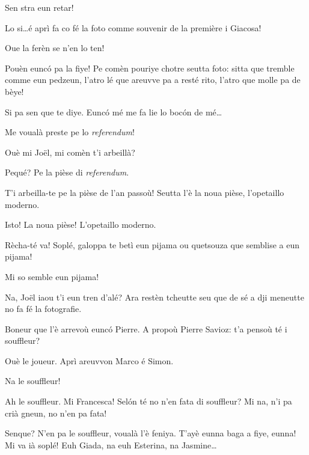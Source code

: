 \begin{drama}
\Francescaspeaks Sen stra eun retar!

\Joellespeaks Lo si\ldots é aprì fa co fé la foto comme souvenir de la première i Giacosa!

\Francescaspeaks Oue la ferèn se n'en lo ten!

 \Joellespeaks Pouèn euncó pa la fiye! Pe comèn pouriye chotre seutta foto: sitta  que tremble comme eun pedzeun, l’atro lé  que areuvve pa a resté rito, l'atro que molle pa de bèye!
 
 \Francescaspeaks Si pa sen que te diye. Euncó mé me fa lie lo boc\'on de mé\ldots
 

\Joelspeaks{} Me voualà preste pe lo \textit{referendum}!

\Joellespeaks Ouè mi Jo\"{e}l, mi comèn t'i arbeillà?

\Joelspeaks Pequé? Pe la pièse di \textit{referendum}.

\Joellespeaks T'i arbeilla-te pe la pièse de l'an passoù! Seutta l'è la noua pièse, l’opetaillo moderno.

\Joelspeaks Isto! La noua pièse! L'opetaillo moderno.

\Joellespeaks Rècha-té va! Soplé, galoppa te betì eun pijama ou quetsouza que semblise a eun pijama!

\Joelspeaks Mi so semble eun pijama!


\Francescaspeaks{} Na, Jo\"{e}l iaou t'i eun tren d'alé? Ara restèn tcheutte seu que de sé a dji meneutte no fa fé la fotografie. 


\Francescaspeaks Boneur que l'è arrevoù euncó Pierre.  A propoù Pierre Savioz: t'a pensoù té i souffleur?

\Pierrespeaks Ouè le joueur. Aprì areuvvon Marco é Simon.

\Francescaspeaks Na le souffleur!
 
\Pierrespeaks Ah le souffleur. Mi Francesca! Sel\'on té no n'en fata di souffleur? Mi na, n'i pa crià gneun, no n'en pa fata!
 
\Cimaspeaks Senque? N'en pa le souffleur, voualà l'è feniya. T'ayè eunna baga a fiye, eunna!  Mi va ià soplé!  Euh Giada, na euh Esterina, na Jasmine\ldots


\end{drama}
